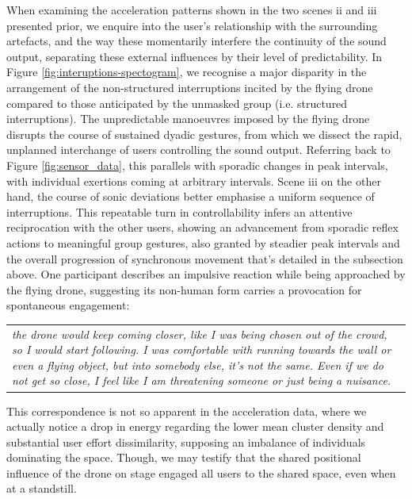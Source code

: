 When examining the acceleration patterns shown in the two scenes ii and iii presented prior, we enquire into the user's relationship with the surrounding artefacts, and the way these momentarily interfere the continuity of the sound output, separating these external influences by their level of predictability. In Figure \ref{fig:interuptions-spectogram}, we recognise a major disparity in the arrangement of the non-structured interruptions incited by the flying drone compared to those anticipated by the unmasked group (i.e. structured interruptions). The unpredictable manoeuvres imposed by the flying drone disrupts the course of sustained dyadic gestures, from which we dissect the rapid, unplanned interchange of users controlling the sound output. Referring back to Figure \ref{fig:sensor_data}, this parallels with sporadic changes in peak intervals, with individual exertions coming at arbitrary intervals. Scene iii on the other hand, the course of sonic deviations better emphasise a uniform sequence of interruptions. This repeatable turn in controllability infers an attentive reciprocation with the other users, showing an advancement from sporadic reflex actions to meaningful group gestures, also granted by steadier peak intervals and the overall progression of synchronous movement that's detailed in the subsection above. One participant describes an impulsive reaction while being approached by the flying drone, suggesting its non-human form carries a provocation for spontaneous engagement:

\begin{center}
\begin{tabular}{ p{13cm}}
\textit{the drone would keep coming closer, like I was being chosen out of the crowd, so I would start following. I was comfortable with running towards the wall or even a flying object, but into somebody else, it's not the same. Even if we do not get so close, I feel like I am threatening someone or just being a nuisance.}
\end{tabular}
\end{center}

This correspondence is not so apparent in the acceleration data, where we actually notice a drop in energy regarding the lower mean cluster density and substantial user effort dissimilarity, supposing an imbalance of individuals dominating the space. Though, we may testify that the shared positional influence of the drone on stage engaged all users to the shared space, even when at a standstill.

